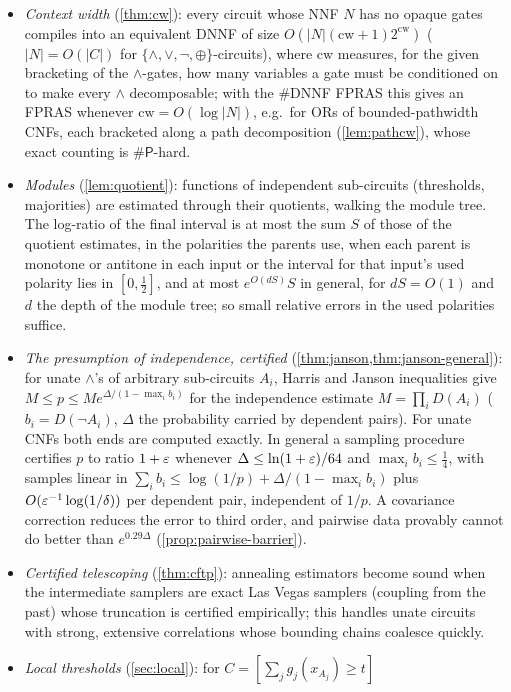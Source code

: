 \begin{itemize}
\item \emph{Context width} (\cref{thm:cw}): every circuit whose NNF $N$ has no opaque
gates compiles into an equivalent DNNF of size $O(|N|(\mathrm{cw}+1)2^{\mathrm{cw}})$
($|N|=O(|C|)$ for $\{\wedge,\vee,\neg,\oplus\}$-circuits), where $\mathrm{cw}$ measures,
for the given bracketing of the $\wedge$-gates, how many variables a gate must be
conditioned on to make every $\wedge$ decomposable; with the \#DNNF FPRAS
\cite{meel2026dnnf} this gives an FPRAS whenever $\mathrm{cw}=O(\log|N|)$, e.g.\ for ORs
of bounded-pathwidth CNFs, each bracketed along a path decomposition
(\cref{lem:pathcw}), whose exact counting is $\#\mathsf P$-hard.
\item \emph{Modules} (\cref{lem:quotient}): functions of independent sub-circuits
(thresholds, majorities) are estimated through their quotients, walking the module
tree. The log-ratio of the final interval is at most the sum $S$ of those of the
quotient estimates, in the polarities the parents use, when each parent is monotone or
antitone in each input or the interval for that input's used polarity lies in
$[0,\frac12]$, and at most $e^{O(dS)}S$ in general, for $dS=O(1)$ and $d$ the depth of
the module tree; so small relative errors in the used polarities suffice.
\item \emph{The presumption of independence, certified}
(\cref{thm:janson,thm:janson-general}): for unate $\wedge$'s of arbitrary
sub-circuits $A_i$, Harris and Janson inequalities give $M\le p\le
Me^{\Delta/(1-\max_ib_i)}$ for the independence estimate $M=\prod_iD(A_i)$
($b_i=D(\neg A_i)$, $\Delta$ the probability carried by dependent pairs). For unate
CNFs both ends are computed exactly. In general a sampling procedure certifies $p$ to
ratio $1+\varepsilon$ whenever $\Delta\le\ln(1+\varepsilon)/64$ and $\max_ib_i\le\frac14$, with
samples linear in $\sum_ib_i\le\log(1/p)+\Delta/(1-\max_ib_i)$ plus
$O(\varepsilon^{-1}\log(1/\delta))$ per dependent pair, independent of $1/p$. A covariance
correction reduces the error to third order, and pairwise data provably cannot do
better than $e^{0.29\Delta}$ (\cref{prop:pairwise-barrier}).
\item \emph{Certified telescoping} (\cref{thm:cftp}): annealing estimators become
sound when the intermediate samplers are exact Las Vegas samplers (coupling from
the past) whose truncation is certified empirically; this handles unate circuits
with strong, extensive correlations whose bounding chains coalesce quickly.
\item \emph{Local thresholds} (\cref{sec:local}): for $C=[\sum_jg_j(x_{A_j})\ge t]$

\end{itemize}
